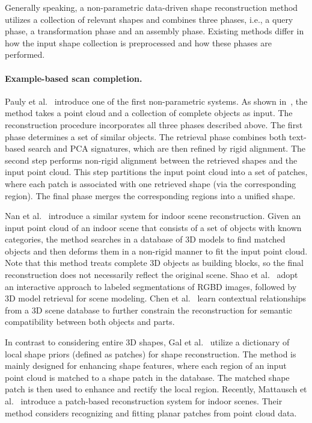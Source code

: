 Generally speaking, a non-parametric data-driven shape reconstruction method utilizes a collection of relevant shapes and combines three phases, i.e., a query phase, a transformation phase and an assembly phase. Existing methods differ in how the input shape collection is preprocessed and how these phases are performed.


\paragraph*{Example-based scan completion.} Pauly et al.~\cite{Pauly:2005:ESC} introduce one of the first non-parametric systems. As shown in~\cite{Pauly:2005:ESC}, the method takes a point cloud and a collection of complete objects as input. The reconstruction procedure incorporates all three phases described above. The first phase determines a set of similar objects. The retrieval phase combines both text-based search and PCA signatures, which are then refined by rigid alignment. The second step performs non-rigid alignment between the retrieved shapes and the input point cloud. This step partitions the input point cloud into a set of patches, where each patch is associated with one retrieved shape (via the corresponding region). The final phase merges the corresponding regions into a unified shape.

Nan et al.~\cite{Nan:2012:SAC} introduce a similar system for indoor scene reconstruction. Given an input point cloud of an indoor scene that consists of a set of objects with known categories, the method searches in a database of 3D models to find matched objects and then deforms them in a non-rigid manner to fit the input point cloud. Note that this method treats complete 3D objects as building blocks, so the final reconstruction does not necessarily reflect the original scene.
Shao et al.~\cite{Shao:2012:IAS} adopt an interactive approach to labeled segmentations of RGBD images, followed by 3D model retrieval for scene modeling. Chen et al.~\cite{Chen:2014:ASM} learn contextual relationships from a 3D scene database to further constrain the reconstruction for semantic compatibility between both objects and parts.

In contrast to considering entire 3D shapes, Gal et al.~\cite{Gal:2007:SRU} utilize a dictionary of local shape priors (defined as patches) for shape reconstruction. The method is mainly designed for enhancing shape features, where each region of an input point cloud is matched to a shape patch in the database. The matched shape patch is then used to enhance and rectify the local region. Recently, Mattausch et al.~\cite{MATTAUSCH:2014:ODC} introduce a patch-based reconstruction system for indoor scenes. Their method considers recognizing and fitting planar patches from point cloud data.

